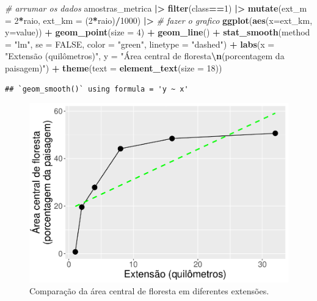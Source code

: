 \documentclass[
]{article}
\newenvironment{Shaded}{\begin{snugshade}}{\end{snugshade}}
\newcommand{\AttributeTok}[1]{\textcolor[rgb]{0.13,0.29,0.53}{#1}}
\newcommand{\CommentTok}[1]{\textcolor[rgb]{0.56,0.35,0.01}{\textit{#1}}}
\newcommand{\ConstantTok}[1]{\textcolor[rgb]{0.56,0.35,0.01}{#1}}
\newcommand{\DecValTok}[1]{\textcolor[rgb]{0.00,0.00,0.81}{#1}}
\newcommand{\FunctionTok}[1]{\textcolor[rgb]{0.13,0.29,0.53}{\textbf{#1}}}
\newcommand{\NormalTok}[1]{#1}
\newcommand{\SpecialCharTok}[1]{\textcolor[rgb]{0.81,0.36,0.00}{\textbf{#1}}}
\newcommand{\StringTok}[1]{\textcolor[rgb]{0.31,0.60,0.02}{#1}}
\begin{document}
\begin{Shaded}
\begin{Highlighting}[]
\CommentTok{\# arrumar os dados}
\NormalTok{amostras\_metrica }\SpecialCharTok{|\textgreater{}} 
  \FunctionTok{filter}\NormalTok{(class}\SpecialCharTok{==}\DecValTok{1}\NormalTok{) }\SpecialCharTok{|\textgreater{}} 
  \FunctionTok{mutate}\NormalTok{(}\AttributeTok{ext\_m =} \DecValTok{2}\SpecialCharTok{*}\NormalTok{raio, }
         \AttributeTok{ext\_km =}\NormalTok{ (}\DecValTok{2}\SpecialCharTok{*}\NormalTok{raio)}\SpecialCharTok{/}\DecValTok{1000}\NormalTok{) }\SpecialCharTok{|\textgreater{}}
\CommentTok{\# fazer o grafico}
  \FunctionTok{ggplot}\NormalTok{(}\FunctionTok{aes}\NormalTok{(}\AttributeTok{x=}\NormalTok{ext\_km, }\AttributeTok{y=}\NormalTok{value)) }\SpecialCharTok{+} 
  \FunctionTok{geom\_point}\NormalTok{(}\AttributeTok{size =} \DecValTok{4}\NormalTok{) }\SpecialCharTok{+} 
  \FunctionTok{geom\_line}\NormalTok{() }\SpecialCharTok{+}
  \FunctionTok{stat\_smooth}\NormalTok{(}\AttributeTok{method =} \StringTok{"lm"}\NormalTok{, }\AttributeTok{se =} \ConstantTok{FALSE}\NormalTok{, }\AttributeTok{color =} \StringTok{"green"}\NormalTok{, }
              \AttributeTok{linetype =} \StringTok{"dashed"}\NormalTok{) }\SpecialCharTok{+} 
  \FunctionTok{labs}\NormalTok{(}\AttributeTok{x =} \StringTok{"Extensão (quilômetros)"}\NormalTok{, }
       \AttributeTok{y =} \StringTok{"Área central de floresta}\SpecialCharTok{\textbackslash{}n}\StringTok{(porcentagem da paisagem)"}\NormalTok{) }\SpecialCharTok{+} 
  \FunctionTok{theme}\NormalTok{(}\AttributeTok{text =} \FunctionTok{element\_text}\NormalTok{(}\AttributeTok{size =} \DecValTok{18}\NormalTok{)) }
\end{Highlighting}
\end{Shaded}

\begin{verbatim}
## `geom_smooth()` using formula = 'y ~ x'
\end{verbatim}

\begin{figure}

{\centering \includegraphics[width=0.55\linewidth,height=0.55\textheight]{epr_files/figure-latex/unnamed-chunk-41-1} 

}

\caption{Comparação da área central de floresta em diferentes extensões.}\label{fig:unnamed-chunk-41}
\end{figure}
\end{document}
